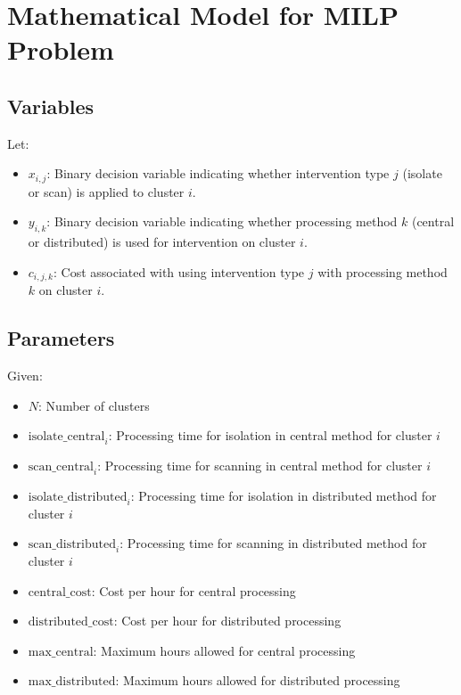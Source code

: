 \documentclass{article}
\begin{document}
\section*{Mathematical Model for MILP Problem}

\subsection*{Variables}
Let:
\begin{itemize}
    \item \( x_{i,j} \): Binary decision variable indicating whether intervention type \( j \) (isolate or scan) is applied to cluster \( i \).
    \item \( y_{i,k} \): Binary decision variable indicating whether processing method \( k \) (central or distributed) is used for intervention on cluster \( i \).
    \item \( c_{i,j,k} \): Cost associated with using intervention type \( j \) with processing method \( k \) on cluster \( i \).
\end{itemize}

\subsection*{Parameters}
Given:
\begin{itemize}
    \item \( N \): Number of clusters
    \item \( \text{isolate\_central}_i \): Processing time for isolation in central method for cluster \( i \)
    \item \( \text{scan\_central}_i \): Processing time for scanning in central method for cluster \( i \)
    \item \( \text{isolate\_distributed}_i \): Processing time for isolation in distributed method for cluster \( i \)
    \item \( \text{scan\_distributed}_i \): Processing time for scanning in distributed method for cluster \( i \)
    \item \( \text{central\_cost} \): Cost per hour for central processing
    \item \( \text{distributed\_cost} \): Cost per hour for distributed processing
    \item \( \text{max\_central} \): Maximum hours allowed for central processing
    \item \( \text{max\_distributed} \): Maximum hours allowed for distributed processing
\end{itemize}
\end{document}
